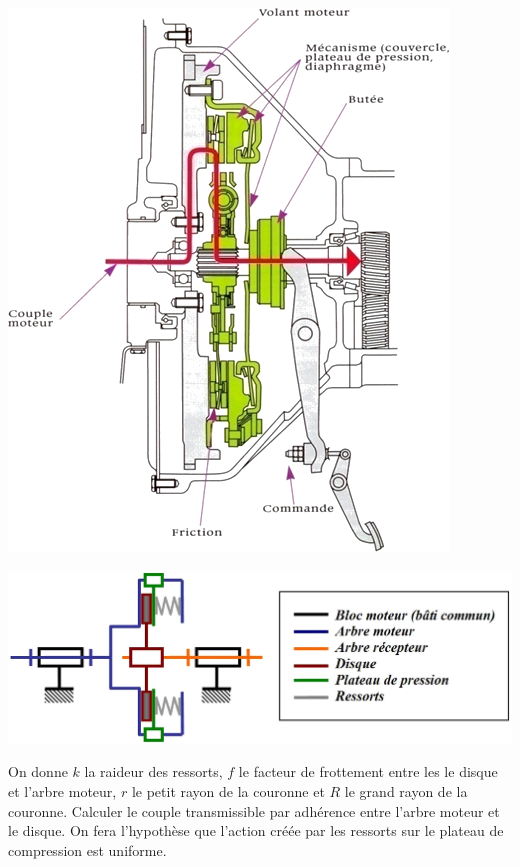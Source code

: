 \documentclass[10pt,fleqn]{article} %
\begin{document}
\begin{minipage}[c]{.3\linewidth}
\begin{center}
\includegraphics[width=.95\textwidth]{images/embrayage}
\end{center}
\end{minipage}\hfill
\begin{minipage}[c]{.65\linewidth}
\begin{center}
\includegraphics[width=.95\textwidth]{images/embrayage2}
\end{center}
\end{minipage}


On donne $k$ la raideur des ressorts, $f$ le facteur de frottement entre les le disque et l'arbre moteur, $r$ le petit rayon de la couronne et $R$ le grand rayon de la couronne. Calculer le couple transmissible par adhérence entre l'arbre moteur et le disque. On fera l'hypothèse que l'action créée par les ressorts sur le plateau de compression est uniforme. 
\end{document}
